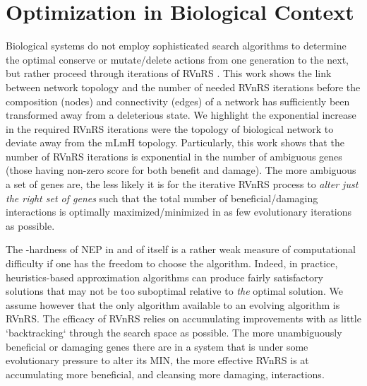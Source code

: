 \section{Optimization in Biological Context}\label{opt_in_bio_context}
    Biological systems do not employ sophisticated search algorithms to determine the optimal conserve or mutate/delete actions from one generation to the next, but rather proceed through iterations of RVnRS \cite{carvunis_proto-genes_2012}. This work shows the link between network topology and the number of needed RVnRS iterations before the composition (nodes) and connectivity (edges) of a network has sufficiently been transformed away from a deleterious state. We highlight the exponential increase in the required RVnRS iterations were the topology of biological network to deviate away from the mLmH topology. 
    Particularly, this work shows that the number of RVnRS iterations is exponential in the number of ambiguous genes (those having non-zero score for both benefit and damage).
    The more ambiguous a set of genes are, the less likely it is for the iterative RVnRS process to \textit{alter just the right set of genes} such that the total number of beneficial/damaging interactions is optimally maximized/minimized in as few evolutionary iterations as possible. 

    The -hardness of NEP in and of itself is a rather weak measure of computational difficulty if one has the freedom to choose the algorithm. Indeed, in practice, heuristics-based approximation algorithms can produce fairly satisfactory solutions that may not be too suboptimal relative to \textit{the} optimal solution. We assume however that the only algorithm available to an evolving algorithm is RVnRS. 
    The efficacy of RVnRS relies on accumulating improvements with as little `backtracking` through the search space as possible. The more unambiguously beneficial or damaging genes there are in a system that is under some evolutionary pressure to alter its MIN, the more effective RVnRS is at accumulating more beneficial, and cleansing more damaging, interactions.

